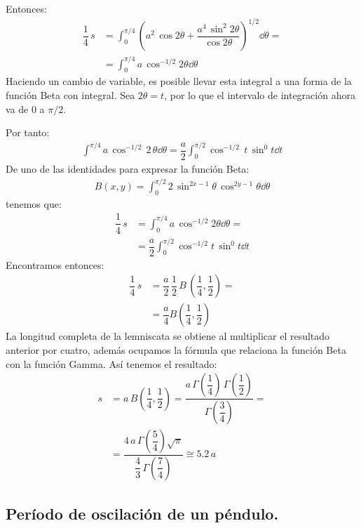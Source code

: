 Entonces:
\begin{align*}
\dfrac{1}{4} \, s &= \int_{0}^{\pi/4} \left( a^{2} \, \cos 2 \theta + \dfrac{a^{4} \, \sin^{2} 2 \theta}{\cos 2 \theta} \right)^{1/2} \dd{\theta} = \\[1em]
&= \int_{0}^{\pi/4} a \, \cos^{-1/2} 2 \theta \dd{\theta}
\end{align*}
Haciendo un cambio de variable, es posible llevar esta integral a una forma de la función Beta con integral. Sea $2 \theta = t$, por lo que el intervalo de integración ahora va de $0$ a $\pi/2$.
\par
Por tanto:
\begin{align*}
\int_{}^{\pi/4} a \, \cos^{-1/2} \, 2 \, \theta \dd{\theta} = \dfrac{a}{2} \int_{0}^{\pi/2} \cos^{-1/2} \, t \, \sin^{0} t \dd{t}
\end{align*}
De uno de las identidades para expresar la función Beta:
\begin{align*}
B(x, y) = \int_{0}^{\pi/2} 2 \, \sin^{2x-1} \theta \, \cos^{2y-1} \theta \dd{\theta}
\end{align*}
tenemos que:
\begin{align*}
\dfrac{1}{4} \, s &= \int_{0}^{\pi/4} a \, \cos^{-1/2} 2 \theta \dd{\theta} =  \\[0.5em]
&= \dfrac{a}{2} \int_{0}^{\pi/2} \cos^{-1/2} t \, \sin^{0} t \dd{t}
\end{align*}
Encontramos entonces:
\begin{align*}
\dfrac{1}{4} \, s &= \dfrac{a}{2} \, \dfrac{1}{2} \, B \, \left(\dfrac{1}{4}, \dfrac{1}{2} \right) = \\[1em]
&= \dfrac{a}{4} B\left(\dfrac{1}{4}, \dfrac{1}{2} \right)
\end{align*}
La longitud completa de la lemniscata se obtiene al multiplicar el resultado anterior por cuatro, además ocupamos la fórmula que relaciona la función Beta con la función Gamma. Así tenemos el resultado:
\begin{align*}
s &= a \, B\left(\dfrac{1}{4}, \dfrac{1}{2} \right) = \dfrac{a \, \Gamma \left( \dfrac{1}{4} \right) \, \Gamma \left( \dfrac{1}{2} \right) }{\Gamma \left( \dfrac{3}{4} \right)} = \\
&= \dfrac{4 \, a \, \Gamma \left( \dfrac{5}{4} \right) \sqrt{\pi}}{\dfrac{4}{3} \, \Gamma \left( \dfrac{7}{4} \right)} \cong 5.2 \, a
\end{align*}

\subsection{Período de oscilación de un péndulo.}

